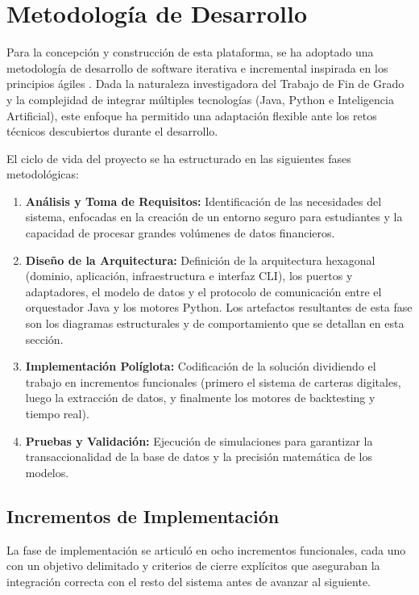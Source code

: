
\section{Metodología de Desarrollo}
Para la concepción y construcción de esta plataforma, se ha adoptado una metodología de desarrollo de software iterativa e incremental inspirada en los principios ágiles \parencite{martin_agile_2003}. Dada la naturaleza investigadora del Trabajo de Fin de Grado y la complejidad de integrar múltiples tecnologías (Java, Python e Inteligencia Artificial), este enfoque ha permitido una adaptación flexible ante los retos técnicos descubiertos durante el desarrollo.

El ciclo de vida del proyecto se ha estructurado en las siguientes fases metodológicas:
\begin{enumerate}
    \item \textbf{Análisis y Toma de Requisitos:} Identificación de las necesidades del sistema, enfocadas en la creación de un entorno seguro para estudiantes y la capacidad de procesar grandes volúmenes de datos financieros.
    \item \textbf{Diseño de la Arquitectura:} Definición de la arquitectura hexagonal (dominio, aplicación, infraestructura e interfaz CLI), los puertos y adaptadores, el modelo de datos y el protocolo de comunicación entre el orquestador Java y los motores Python. Los artefactos resultantes de esta fase son los diagramas estructurales y de comportamiento que se detallan en esta sección.
    \item \textbf{Implementación Políglota:} Codificación de la solución dividiendo el trabajo en incrementos funcionales (primero el sistema de carteras digitales, luego la extracción de datos, y finalmente los motores de backtesting y tiempo real).
    \item \textbf{Pruebas y Validación:} Ejecución de simulaciones para garantizar la transaccionalidad de la base de datos y la precisión matemática de los modelos.
\end{enumerate}

\subsection{Incrementos de Implementación}

La fase de implementación se articuló en ocho incrementos funcionales, cada uno con un objetivo delimitado y criterios de cierre explícitos que aseguraban la integración correcta con el resto del sistema antes de avanzar al siguiente.

